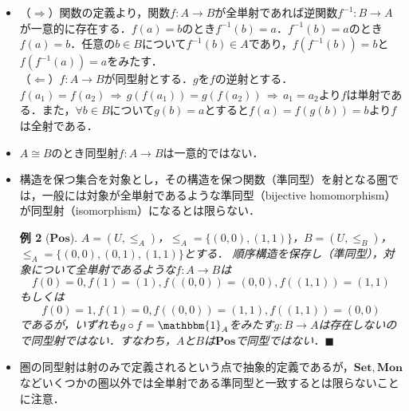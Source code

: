 \documentclass[dvipdfmx,a4j,10pt]{jsarticle}
\makeatletter
\theoremstyle{mystyle1}
\theoremstyle{mystyle2}
\newtheorem{example}{例}
\renewenvironment{proof}[1][\proofname]{\par
  \pushQED{\qed}%
  \normalfont
  \topsep6\p@\@plus6\p@ \trivlist
  \item[\hskip\labelsep{\bfseries\sffamily #1}]\ignorespaces
}{%
  \popQED\endtrivlist\@endpefalse
}
\renewcommand\proofname{証明}
\makeatother
\begin{document}
\begin{itemize}
          \begin{example}[\textbf{Set}]
              $\mathbf{Set}$の同型射は全単射と一致する．
          \end{example}
          \begin{proof}
              （$\Rightarrow$）関数の定義より，関数$f:A\to B$が全単射であれば逆関数$f^{-1}:B\to A$が一意的に存在する．$f(a)=b$のとき$f^{-1}(b)=a$．$f^{-1}(b)=a$のとき$f(a)=b$．任意の$b\in B$について$f^{-1}(b)\in A$であり，$f(f^{-1}(b))=b$と$f(f^{-1}(a))=a$をみたす．\\
              （$\Leftarrow$）$f:A\to B$が同型射とする．$g$を$f$の逆射とする．$f(a_1)=f(a_2)\,\Rightarrow\, g(f(a_1))=g(f(a_2))\,\Rightarrow\, a_1=a_2$より$f$は単射である．また，$\forall b\in B$について$g(b)=a$とすると$f(a)=f(g(b))=b$より$f$は全射である．
          \end{proof}
    \item $A\cong B$のとき同型射$f:A\to B$は一意的ではない．
    \item 構造を保つ集合を対象とし，その構造を保つ関数（準同型）を射となる圏では，一般には対象が全単射であるような準同型（bijective homomorphism）が同型射（isomorphism）になるとは限らない．
          \begin{example}[$\mathbf{Pos}$]
              $A=(U,\leq_A)$，$\leq_A=\{(0,0),(1,1)\}$，$B=(U,\leq_B)$，$\leq_A=\{(0,0),(0,1),(1,1)\}$とする．
              順序構造を保存し（準同型），対象について全単射であるような$f:A\to B$は
              \[
                  f(0)=0,f(1)=(1),f((0,0))=(0,0),f((1,1))=(1,1)
              \]
              もしくは
              \[
                  f(0)=1,f(1)=0,f((0,0))=(1,1),f((1,1))=(0,0)
              \]
              であるが，いずれも$g\circ f=\mathbbm{1}_A$をみたす$g:B\to A$は存在しないので同型射ではない．すなわち，$A$と$B$は$\mathbf{Pos}$で同型ではない．$\blacksquare$
          \end{example}
    \item 圏の同型射は射のみで定義されるという点で抽象的定義であるが，$\mathbf{Set},\mathbf{Mon}$などいくつかの圏以外では全単射である準同型と一致するとは限らないことに注意．
\end{itemize}
\end{document}
